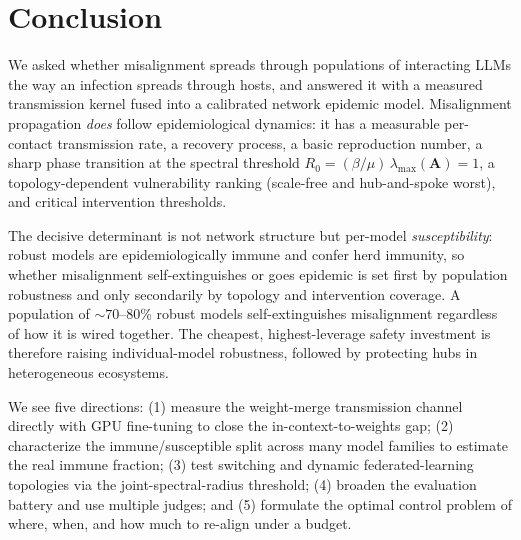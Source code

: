 \section{Conclusion}
\label{sec:conclusion}

We asked whether misalignment spreads through populations of interacting LLMs the
way an infection spreads through hosts, and answered it with a measured
transmission kernel fused into a calibrated network epidemic model. Misalignment
propagation \emph{does} follow epidemiological dynamics: it has a measurable
per-contact transmission rate, a recovery process, a basic reproduction number, a
sharp phase transition at the spectral threshold $R_0=(\beta/\mu)\,
\lambda_{\max}(\mathbf{A})=1$, a topology-dependent vulnerability ranking
(scale-free and hub-and-spoke worst), and critical intervention thresholds.

 The decisive determinant is not network structure but
per-model \emph{susceptibility}: robust models are epidemiologically immune and
confer herd immunity, so whether misalignment self-extinguishes or goes epidemic
is set first by population robustness and only secondarily by topology and
intervention coverage. A population of ${\sim}70$--$80\%$ robust models
self-extinguishes misalignment regardless of how it is wired together. The
cheapest, highest-leverage safety investment is therefore raising individual-model
robustness, followed by protecting hubs in heterogeneous ecosystems.

 We see five directions: (1) measure the weight-merge
transmission channel directly with GPU fine-tuning to close the
in-context-to-weights gap; (2) characterize the immune/susceptible split across
many model families to estimate the real immune fraction; (3) test switching and
dynamic federated-learning topologies via the joint-spectral-radius threshold; (4)
broaden the evaluation battery and use multiple judges; and (5) formulate the
optimal control problem of where, when, and how much to re-align under a budget.
